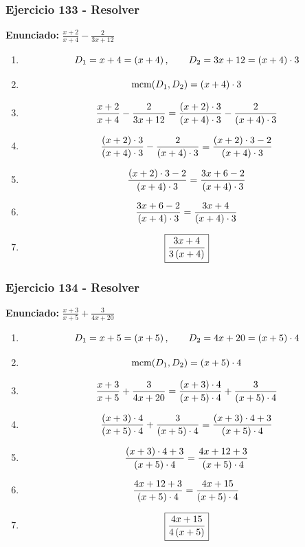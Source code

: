 \documentclass[11pt,a4paper]{article}
\newcommand{\fitmath}[1]{%
\[
\setbox0=\hbox{$\displaystyle #1$}%
\ifdim\wd0>\linewidth
\resizebox{\linewidth}{!}{$\displaystyle #1$}%
\else
#1%
\fi
\]
}
\begin{document}
\vspace{0.12cm}
\subsubsection*{Ejercicio 133 - Resolver}
\textbf{Enunciado:} $ \frac{x + 2}{x + 4} - \frac{2}{3 x + 12} $\par
\begin{enumerate}[leftmargin=2em]
\item \fitmath{D_1=x + 4=\left(x + 4\right),\qquad D_2=3 x + 12=\left(x + 4\right)\cdot 3}
\item \fitmath{\operatorname{mcm}(D_1,D_2)=\left(x + 4\right)\cdot 3}
\item \fitmath{\frac{x + 2}{x + 4} - \frac{2}{3 x + 12}= \frac{\left(x + 2\right)\cdot 3}{\left(x + 4\right)\cdot 3} - \frac{2}{\left(x + 4\right)\cdot 3}}
\item \fitmath{\frac{\left(x + 2\right)\cdot 3}{\left(x + 4\right)\cdot 3} - \frac{2}{\left(x + 4\right)\cdot 3}=\frac{\left(x + 2\right)\cdot 3 - 2}{\left(x + 4\right)\cdot 3}}
\item \fitmath{\frac{\left(x + 2\right)\cdot 3 - 2}{\left(x + 4\right)\cdot 3}=\frac{3 x + 6 - 2}{\left(x + 4\right)\cdot 3}}
\item \fitmath{\frac{3 x + 6 - 2}{\left(x + 4\right)\cdot 3}=\frac{3 x + 4}{\left(x + 4\right)\cdot 3}}
\item \fitmath{\boxed{\frac{3 x + 4}{3 \left(x + 4\right)}}}
\end{enumerate}

\vspace{0.12cm}
\subsubsection*{Ejercicio 134 - Resolver}
\textbf{Enunciado:} $ \frac{x + 3}{x + 5} + \frac{3}{4 x + 20} $\par
\begin{enumerate}[leftmargin=2em]
\item \fitmath{D_1=x + 5=\left(x + 5\right),\qquad D_2=4 x + 20=\left(x + 5\right)\cdot 4}
\item \fitmath{\operatorname{mcm}(D_1,D_2)=\left(x + 5\right)\cdot 4}
\item \fitmath{\frac{x + 3}{x + 5} + \frac{3}{4 x + 20}= \frac{\left(x + 3\right)\cdot 4}{\left(x + 5\right)\cdot 4} + \frac{3}{\left(x + 5\right)\cdot 4}}
\item \fitmath{\frac{\left(x + 3\right)\cdot 4}{\left(x + 5\right)\cdot 4} + \frac{3}{\left(x + 5\right)\cdot 4}=\frac{\left(x + 3\right)\cdot 4 + 3}{\left(x + 5\right)\cdot 4}}
\item \fitmath{\frac{\left(x + 3\right)\cdot 4 + 3}{\left(x + 5\right)\cdot 4}=\frac{4 x + 12 + 3}{\left(x + 5\right)\cdot 4}}
\item \fitmath{\frac{4 x + 12 + 3}{\left(x + 5\right)\cdot 4}=\frac{4 x + 15}{\left(x + 5\right)\cdot 4}}
\item \fitmath{\boxed{\frac{4 x + 15}{4 \left(x + 5\right)}}}
\end{enumerate}
\end{document}
